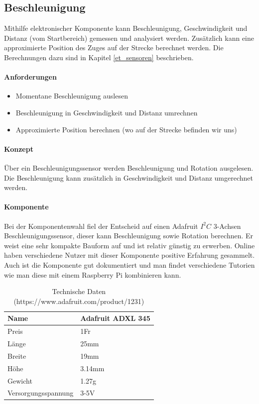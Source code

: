 \documentclass[../../main.tex]{subfiles}
\begin{document}
\subsection{Beschleunigung} \label{pi_beschleunigung}
Mithilfe elektronischer Komponente kann Beschleunigung, Geschwindigkeit und Distanz (vom Startbereich) gemessen und analysiert werden. Zusätzlich kann eine approximierte Position des Zuges auf der Strecke berechnet werden. Die Berechnungen dazu sind in Kapitel \ref{et_sensoren} beschrieben.

\paragraph{Anforderungen}
\begin{itemize}
    \item Momentane Beschleunigung auslesen
    \item Beschleunigung in Geschwindigkeit und Distanz umrechnen
    \item Approximierte Position berechnen (wo auf der Strecke befinden wir uns)
\end{itemize}

\paragraph{Konzept}
Über ein Beschleunigungssensor werden Beschleunigung und Rotation ausgelesen. Die Beschleunigung kann zusätzlich in Geschwindigkeit und Distanz umgerechnet werden.

\paragraph{Komponente}
Bei der Komponentenwahl fiel der Entscheid auf einen Adafruit $I^2C$ 3-Achsen Beschleunigungssensor, dieser kann Beschleunigung sowie Rotation berechnen. Er weist eine sehr kompakte Bauform auf und ist relativ günstig zu erwerben. Online haben verschiedene Nutzer mit dieser Komponente positive Erfahrung gesammelt. Auch ist die Komponente gut dokumentiert und man findet verschiedene Tutorien wie man diese mit einem Raspberry Pi kombinieren kann.

\begin{table}[H]
\begin{center}
\begin{tabular}{ll}
Name & Adafruit ADXL 345  \\ \hline
Preis & 1Fr               \\ \hline
Länge & 25mm              \\ \hline
Breite & 19mm             \\ \hline
Höhe & 3.14mm             \\ \hline
Gewicht & 1.27g           \\ \hline
Versorgungsspannung & 3-5V \\ \hline
\end{tabular}
\caption {Technische Daten (https://www.adafruit.com/product/1231)}
\end{center}
\end{table}
\end{document}
